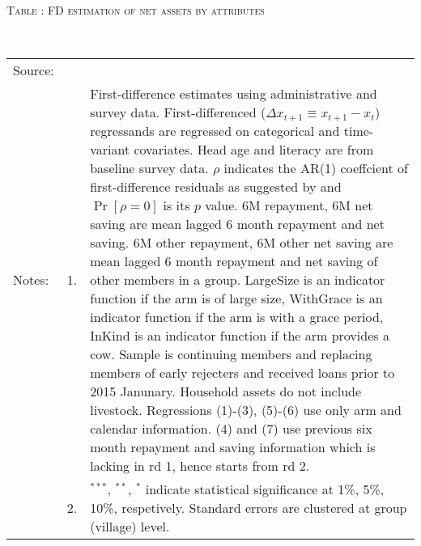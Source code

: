 \hspace{-1cm}\begin{minipage}[t]{14cm}
\hfil\textsc{\normalsize Table \thetable: FD estimation of net assets by attributes\label{tab FD net assets attributes original HHs}}\\
\setlength{\tabcolsep}{1pt}
\setlength{\baselineskip}{8pt}
\renewcommand{\arraystretch}{.55}
\hfil{}\\
\renewcommand{\arraystretch}{.8}
\setlength{\tabcolsep}{1pt}
\begin{tabular}{>{\hfill\scriptsize}p{1cm}<{}>{\hfill\scriptsize}p{.25cm}<{}>{\scriptsize}p{12cm}<{\hfill}}
Source:& \multicolumn{2}{l}{\scriptsize Estimated with GUK administrative and survey data.}\\
Notes: & 1. & First-difference estimates using administrative and survey data. First-differenced ($\Delta x_{t+1}\equiv x_{t+1} - x_{t}$) regressands are regressed on categorical and time-variant covariates. Head age and literacy are from baseline survey data. $\rho$ indicates the AR(1) coeffcient of first-difference residuals as suggested by \citet[][10.71]{Wooldridge2010} and $\Pr[\rho=0]$ is its $p$ value. \textsf{6M repayment, 6M net saving} are mean lagged 6 month repayment and net saving. \textsf{6M other repayment, 6M other net saving} are mean lagged 6 month repayment and net saving of other members in a group. \textsf{LargeSize} is an indicator function if the arm is of large size, \textsf{WithGrace} is an indicator function if the arm is with a grace period, \textsf{InKind} is an indicator function if the arm provides a cow. Sample is continuing members and replacing members of early rejecters and received loans prior to 2015 Janunary. Household assets do not include livestock. Regressions (1)-(3), (5)-(6) use only arm and calendar information. (4) and (7) use previous six month repayment and saving information which is lacking in rd 1, hence starts from rd 2.\\
& 2. & ${}^{***}$, ${}^{**}$, ${}^{*}$ indicate statistical significance at 1\%, 5\%, 10\%, respetively. Standard errors are clustered at group (village) level.
\end{tabular}
\end{minipage}

